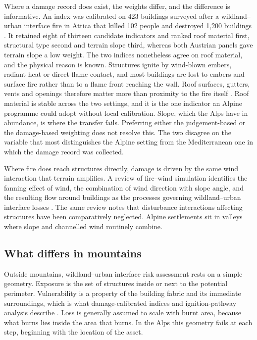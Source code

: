 \documentclass[11pt,a4paper]{article}
\begin{document}
Where a damage record does exist, the weights differ, and the difference is informative. An index was calibrated on 423 buildings surveyed after a wildland--urban interface fire in Attica that killed 102 people and destroyed 1{,}200 buildings \citep{papathomakohle_wildfire_2022}. It retained eight of thirteen candidate indicators and ranked roof material first, structural type second and terrain slope third, whereas both Austrian panels gave terrain slope a low weight. The two indices nonetheless agree on roof material, and the physical reason is known. Structures ignite by wind-blown embers, radiant heat or direct flame contact, and most buildings are lost to embers and surface fire rather than to a flame front reaching the wall. Roof surfaces, gutters, vents and openings therefore matter more than proximity to the fire itself \citep{naser_vulnerability_2025}. Roof material is stable across the two settings, and it is the one indicator an Alpine programme could adopt without local calibration. Slope, which the Alps have in abundance, is where the transfer fails. Preferring either the judgement-based or the damage-based weighting does not resolve this. The two disagree on the variable that most distinguishes the Alpine setting from the Mediterranean one in which the damage record was collected.

Where fire does reach structures directly, damage is driven by the same wind interaction that terrain amplifies. A review of fire--wind simulation identifies the fanning effect of wind, the combination of wind direction with slope angle, and the resulting flow around buildings as the processes governing wildland--urban interface losses \citep{ghodrat_existing_2021}. The same review notes that disturbance interactions affecting structures have been comparatively neglected. Alpine settlements sit in valleys where slope and channelled wind routinely combine.

\subsection{What differs in mountains}

Outside mountains, wildland--urban interface risk assessment rests on a simple geometry. Exposure is the set of structures inside or next to the potential perimeter. Vulnerability is a property of the building fabric and its immediate surroundings, which is what damage-calibrated indices and ignition-pathway analysis describe \citep{papathomakohle_wildfire_2022, naser_vulnerability_2025}. Loss is generally assumed to scale with burnt area, because what burns lies inside the area that burns. In the Alps this geometry fails at each step, beginning with the location of the asset.
\end{document}

